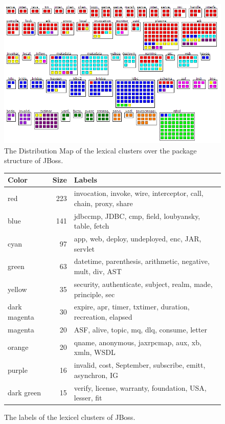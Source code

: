 \begin{figure}[htbp]
\begin{center}
  \includegraphics[width=\linewidth]{fig/hapax-jboss-distribution}
  \caption{The Distribution Map of the lexical clusters over the package structure of JBoss.}
  \label{fig:JBossDistribution}
\end{center}
\end{figure}


\begin{figure}[h]
  \centering
  \begin{scriptsize}
  \begin{tabular}{l|rl}
    \hline
    \textbf{Color} & \textbf{Size} & \textbf{Labels}\\
    \hline
    red & 223 & invocation, invoke, wire, interceptor, call, chain, proxy, share\\
    blue & 141 & jdbccmp, JDBC, cmp, field, loubyansky, table, fetch\\
    cyan & 97 & app, web, deploy, undeployed, enc, JAR, servlet\\
    green & 63 & datetime, parenthesis, arithmetic, negative, mult, div, AST\\
    yellow & 35 & security, authenticate, subject, realm, made, principle, sec\\
    dark magenta & 30 & expire, apr, timer, txtimer, duration, recreation, elapsed\\
    magenta & 20 & ASF, alive, topic, mq, dlq, consume, letter\\
    orange & 20 & qname, anonymous, jaxrpcmap, aux, xb, xmln, WSDL\\
    purple & 16 & invalid, cost, September, subscribe, emitt, asynchron, IG\\
    dark green & 15 & verify, license, warranty, foundation, USA, lesser, fit\\
    \hline
  \end{tabular}
  \end{scriptsize}
  \caption{The labels of the lexicel clusters of JBoss.}\label{fig:JBossLabels}
\end{figure}


